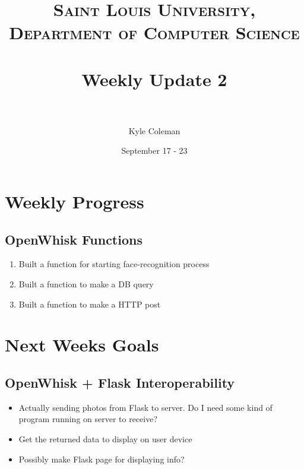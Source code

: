 \documentclass[paper=a4, fontsize=12pt]{scrartcl} %
\title{	
\normalfont \normalsize 
\textsc{Saint Louis University, Department of Computer Science} \\ [25pt] %
\horrule{0.5pt} \\[0.4cm] %
\huge Weekly Update 2\\ %
\horrule{2pt} \\[0.5cm] %
}
\author{Kyle Coleman} %
\date{September 17 - 23} %
\numberwithin{equation}{section} %
\numberwithin{figure}{section} %
\numberwithin{table}{section} %
\begin{document}
\maketitle %


\section{Weekly Progress}





\subsection{OpenWhisk Functions}
\begin{enumerate}
	\item Built a function for starting face-recognition process
    \item Built a function to make a DB query
	\item Built a function to make a HTTP post
\end{enumerate}




\section{Next Weeks Goals}


\subsection{OpenWhisk + Flask Interoperability}
\begin{itemize}
	\item Actually sending photos from Flask to server. Do I need some kind of program running on server to receive?
	\item Get the returned data to display on user device
	\item Possibly make Flask page for displaying info?
	
\end{itemize}
\end{document}
